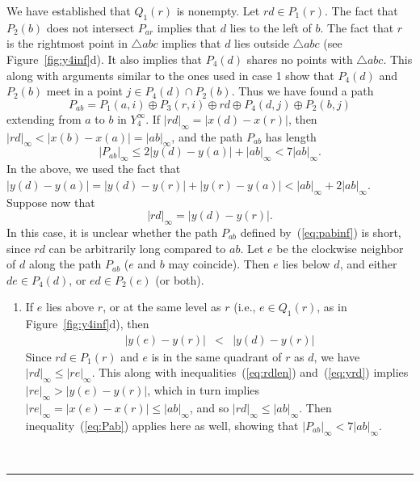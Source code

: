 \pdfoutput=1  \documentclass[11pt]{article}
\newcommand{\qed}{\rule{0.5em}{1.5ex}}
\newcommand{\fqed}{{\hfill~\qed}}
\newenvironment{proof}{{\noindent \bf Proof.}}
                      {{\hfill \fqed} \vspace{1em}}
\begin{document}
\begin{proof}
We have established that $Q_1(r)$ is nonempty. Let $rd \in P_1(r)$.
The fact that $P_2(b)$ does not intersect $P_{ar}$ implies that $d$
lies to the left of $b$.
The fact that $r$ is the rightmost point in $\triangle abc$ implies that
$d$ lies outside $\triangle abc$ (see Figure~\ref{fig:y4inf}d). It also implies that
$P_4(d)$ shares no points with $\triangle abc$. This along with
arguments similar to the ones used in case 1 show that
$P_4(d)$ and $P_2(b)$ meet in a point $j \in P_4(d) \cap P_2(b)$.
Thus we have found a path
\begin{equation}
P_{ab} = P_1(a,i) \oplus P_3(r, i) \oplus rd \oplus P_4(d, j) \oplus P_2(b, j)
\label{eq:pabinf}
\end{equation}
extending from $a$ to $b$ in $Y_4^\infty$. If $|rd|_\infty = |x(d) - x(r)|$, then
$|rd|_\infty < |x(b)-x(a)| = |ab|_\infty$, and the path $P_{ab}$ has length
\begin{equation}
|P_{ab}|_\infty \le 2 |y(d)-y(a)| + |ab|_\infty < 7|ab|_\infty.
\label{eq:Pab}
\end{equation}
In the above, we used the fact that
$|y(d)-y(a)| = |y(d)-y(r)| + |y(r)-y(a)| < |ab|_\infty +2|ab|_\infty$.
Suppose now that
\begin{equation}
|rd|_\infty = |y(d) - y(r)|.
\label{eq:rdlen}
\end{equation}
In this case, it is unclear whether the path $P_{ab}$ defined by~(\ref{eq:pabinf}) is short,
since $rd$ can be arbitrarily long compared to $ab$. Let $e$ be the clockwise
neighbor of $d$ along the path $P_{ab}$ ($e$ and $b$ may coincide).
Then $e$ lies below $d$, and either $de \in P_4(d)$, or $ed \in P_2(e)$ (or both).
\begin{enumerate}
\item
If $e$ lies above $r$, or at the same level as $r$ (i.e., $e \in Q_1(r)$, as in Figure~\ref{fig:y4inf}d), then
\begin{eqnarray}
|y(e) - y(r)| & < & |y(d) - y(r)|
\label{eq:yrd}
\end{eqnarray}
Since $rd \in P_1(r)$ and $e$ is in the same quadrant of $r$ as $d$, we have
$|rd|_\infty \le |re|_\infty$. This along with inequalities~(\ref{eq:rdlen})
and~(\ref{eq:yrd}) implies $|re|_\infty > |y(e) - y(r)|$, which in turn
implies $|re|_\infty = |x(e) - x(r)| \le |ab|_\infty$, and so
$|rd|_\infty \le |ab|_\infty$.
Then inequality~(\ref{eq:Pab}) applies here
as well, showing that $|P_{ab}|_\infty < 7|ab|_\infty$.


\end{enumerate}
\end{proof}
\end{document}
